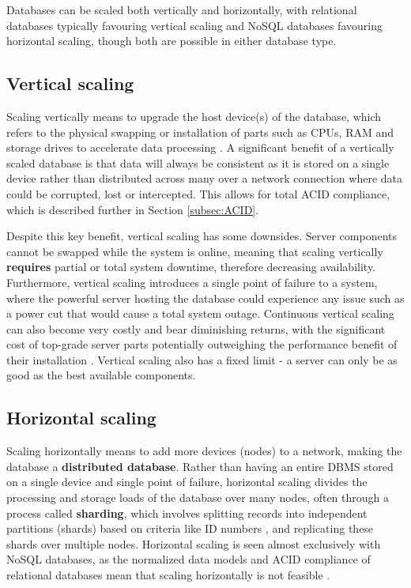 \para Databases can be scaled both vertically and horizontally, with relational databases typically favouring vertical scaling and NoSQL 
databases favouring horizontal scaling, though both are possible in either database type. 

\subsection{Vertical scaling}
Scaling vertically means to upgrade the host device(s) of the database, which refers to the physical swapping or installation of 
parts such as CPUs, RAM and storage drives to accelerate data processing \autocite{cattellScalableSQLNoSQL2011}. 
A significant benefit of a vertically scaled database is that data will always be consistent as it is stored on a single device rather than
distributed across many over a network connection where data could be corrupted, lost or intercepted. This allows for total ACID compliance,
which is described further in Section \ref{subsec:ACID}. 

\para Despite this key benefit, vertical scaling has some downsides. Server components cannot be swapped while the system is online, meaning 
that scaling vertically \textbf{requires} partial or total system downtime, therefore decreasing availability. Furthermore, vertical scaling 
introduces a single point of failure to a system, where the powerful server hosting the database could experience any issue such as a power cut 
that would cause a total system outage. Continuous vertical scaling can also become very costly and bear diminishing returns, with the 
significant cost of top-grade server parts potentially outweighing the performance benefit of their installation 
\autocite{mongodbGuideHorizontalVs}. Vertical scaling also has a fixed limit - a server can only be as good as the best available components.


\subsection{Horizontal scaling}\label{sec:HorizontalScaling}

Scaling horizontally means to add more devices (nodes) to a network, making the database a \textbf{distributed database}. Rather 
than having an entire DBMS stored on a single device and single point of failure, horizontal scaling divides the processing and storage 
loads of the database over many nodes, often through a process called \textbf{sharding}, which involves splitting records into independent 
partitions (shards) based on criteria like ID numbers \autocite{corbelliniPersistingBigdataNoSQL2017}, and replicating these shards over multiple 
nodes. Horizontal scaling is seen almost exclusively with NoSQL databases, as the normalized data models and ACID compliance of relational 
databases mean that scaling horizontally is not feasible \autocite{hechtNoSQLEvaluationUse2011}. 

